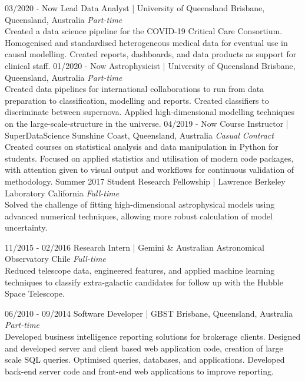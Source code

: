 \documentclass[11pt]{friggeri-cv}
\begin{document}
\begin{entrylist}
\entry
{03/2020 - Now}
{Lead Data Analyst | University of Queensland}
{Brisbane, Queensland, Australia}
{\emph{Part-time} \\
Created a data science pipeline for the COVID-19 Critical Care Consortium. Homogenised and standardised heterogeneous medical data for eventual use in causal modelling. Created reports, dashboards, and data products as support for clinical staff.}
\entry
{01/2020 - Now}
{Astrophysicist | University of Queensland}
{Brisbane, Queensland, Australia}
{\emph{Part-time} \\
Created data pipelines for international collaborations to run from data preparation to classification, modelling and reports. Created classifiers to discriminate between supernova. Applied high-dimensional modelling techniques on the large-scale-structure in the universe.}
\entry
{04/2019 - Now}
{Course Instructor | SuperDataScience}
{Sunshine Coast, Queensland, Australia}
{\emph{Casual Contract} \\
Created courses on statistical analysis and data manipulation in Python for students. Focused on applied statistics and utilisation of modern code packages, with attention given to visual output and workflows for continuous validation of methodology.}
\entry
{Summer 2017}
{Student Research Fellowship | Lawrence Berkeley Laboratory}
{ California}
{ \emph{Full-time} \\
Solved the challenge of fitting high-dimensional astrophysical models using advanced numerical techniques, allowing more robust calculation of model uncertainty.}
\end{entrylist}
\begin{entrylist}
\entry
{11/2015 - 02/2016}
{Research Intern | Gemini \& Australian Astronomical Observatory}
{Chile}
{\emph{Full-time} \\
Reduced telescope data, engineered features, and applied machine learning techniques to classify extra-galactic candidates for follow up with the Hubble Space Telescope.}
\end{entrylist}
\begin{entrylist}
\entry
{06/2010 - 09/2014}
{Software Developer | GBST}
{Brisbane, Queensland, Australia}
{\emph{Part-time} \\
Developed business intelligence reporting solutions for brokerage clients. Designed and developed server and client based web application code, creation of large scale SQL queries. Optimised queries, databases, and applications. Developed back-end server code and front-end web applications to improve reporting.}

\end{entrylist}
\end{document}
